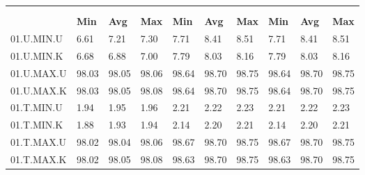 \begin{tabular}{|>{\raggedright}p{}|>{\raggedright}p{}|>{\raggedright}p{}|>{\raggedright}p{}|>{\raggedright}p{}|>{\raggedright}p{}|>{\raggedright}p{}|>{\raggedright}p{}|>{\raggedright}p{}|>{\raggedright}p{}|}
\hline 
\multirow{3}{0.12\columnwidth}{\textbf{\footnotesize{}Bezeichnung}} & \multicolumn{9}{l|}{\textbf{\footnotesize{}RX-Bitrate {[}MBit/s{]}}}\tabularnewline
\cline{2-10} 
& \multicolumn{3}{l|}{\textbf{\footnotesize{}prp1}} & \multicolumn{3}{l|}{\textbf{\footnotesize{}eth0}} & \multicolumn{3}{l|}{\textbf{\footnotesize{}eth1}}\tabularnewline
\cline{2-10} 
& \textbf{\footnotesize{}Min} & \textbf{\footnotesize{}Avg} & \textbf{\footnotesize{}Max} & \textbf{\footnotesize{}Min} & \textbf{\footnotesize{}Avg} & \textbf{\footnotesize{}Max} & \textbf{\footnotesize{}Min} & \textbf{\footnotesize{}Avg} & \textbf{\footnotesize{}Max}\tabularnewline
\hline 
\hline 
{\footnotesize{}01.U.MIN.U} & {\footnotesize{}6.61} & {\footnotesize{}7.21} & {\footnotesize{}7.30} & {\footnotesize{}7.71} & {\footnotesize{}8.41} & {\footnotesize{}8.51} & {\footnotesize{}7.71} & {\footnotesize{}8.41} & {\footnotesize{}8.51}\tabularnewline
\hline 
\hline 
{\footnotesize{}01.U.MIN.K} & {\footnotesize{}6.68} & {\footnotesize{}6.88} & {\footnotesize{}7.00} & {\footnotesize{}7.79} & {\footnotesize{}8.03} & {\footnotesize{}8.16} & {\footnotesize{}7.79} & {\footnotesize{}8.03} & {\footnotesize{}8.16}\tabularnewline
\hline 
\hline 
{\footnotesize{}01.U.MAX.U} & {\footnotesize{}98.03} & {\footnotesize{}98.05} & {\footnotesize{}98.06} & {\footnotesize{}98.64} & {\footnotesize{}98.70} & {\footnotesize{}98.75} & {\footnotesize{}98.64} & {\footnotesize{}98.70} & {\footnotesize{}98.75}\tabularnewline
\hline 
\hline 
{\footnotesize{}01.U.MAX.K} & {\footnotesize{}98.03} & {\footnotesize{}98.05} & {\footnotesize{}98.08} & {\footnotesize{}98.64} & {\footnotesize{}98.70} & {\footnotesize{}98.75} & {\footnotesize{}98.64} & {\footnotesize{}98.70} & {\footnotesize{}98.75}\tabularnewline
\hline 
\hline 
{\footnotesize{}01.T.MIN.U} & {\footnotesize{}1.94} & {\footnotesize{}1.95} & {\footnotesize{}1.96} & {\footnotesize{}2.21} & {\footnotesize{}2.22} & {\footnotesize{}2.23} & {\footnotesize{}2.21} & {\footnotesize{}2.22} & {\footnotesize{}2.23}\tabularnewline
\hline 
\hline 
{\footnotesize{}01.T.MIN.K} & {\footnotesize{}1.88} & {\footnotesize{}1.93} & {\footnotesize{}1.94} & {\footnotesize{}2.14} & {\footnotesize{}2.20} & {\footnotesize{}2.21} & {\footnotesize{}2.14} & {\footnotesize{}2.20} & {\footnotesize{}2.21}\tabularnewline
\hline 
\hline 
{\footnotesize{}01.T.MAX.U} & {\footnotesize{}98.02} & {\footnotesize{}98.04} & {\footnotesize{}98.06} & {\footnotesize{}98.67} & {\footnotesize{}98.70} & {\footnotesize{}98.75} & {\footnotesize{}98.67} & {\footnotesize{}98.70} & {\footnotesize{}98.75}\tabularnewline
\hline 
\hline 
{\footnotesize{}01.T.MAX.K} & {\footnotesize{}98.02} & {\footnotesize{}98.05} & {\footnotesize{}98.08} & {\footnotesize{}98.63} & {\footnotesize{}98.70} & {\footnotesize{}98.75} & {\footnotesize{}98.63} & {\footnotesize{}98.70} & {\footnotesize{}98.75}\tabularnewline
\hline 
\end{tabular}
\par
